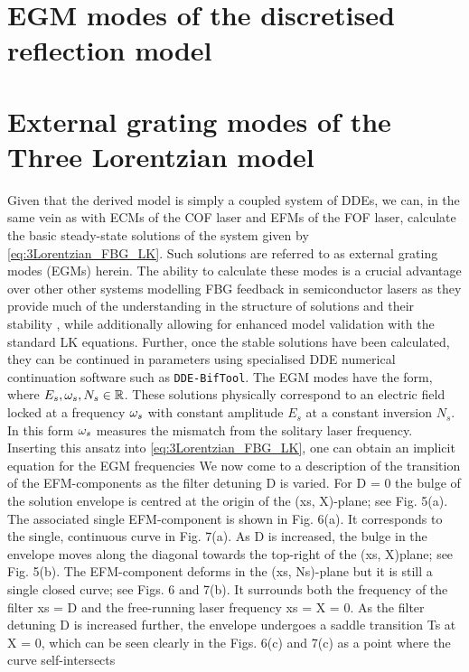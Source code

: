 \section{EGM modes of the discretised reflection model}
\label{sec:EGM_discretised}
%
\section{External grating modes of the Three Lorentzian model}
%
Given that the derived model is simply a coupled system of DDEs, we can, in the same vein as with ECMs of the COF laser and EFMs of the FOF laser, calculate the basic steady-state solutions of the system given by \eqref{eq:3Lorentzian_FBG_LK}. 
Such solutions are referred to as external grating modes (EGMs) herein. 
The ability to calculate these modes is a crucial advantage over other other systems modelling FBG feedback in semiconductor lasers as they provide much of the understanding in the structure of solutions and their stability \cite{rottschafer2007ecm}, while additionally allowing for enhanced model validation with the standard LK equations. 
Further, once the stable solutions have been calculated, they can be continued in parameters using specialised DDE numerical continuation software such as \texttt{DDE-BifTool}. 
The EGM modes have the form,
%
where $E_s, \omega_s, N_s \in \mathbb{R}$. 
These solutions physically correspond to an electric field locked at a frequency $\omega_s$ with constant amplitude $E_s$ at a constant inversion $N_s$. 
In this form $\omega_s$ measures the mismatch from the solitary laser frequency. 
Inserting this ansatz into \eqref{eq:3Lorentzian_FBG_LK}, one can obtain an implicit equation for the EGM frequencies
%
We now come to a description of the transition of the EFM-components as the filter detuning D is varied. 
For D = 0 the bulge of the solution envelope is centred at the origin of the (xs, X)-plane; see Fig. 5(a). 
The associated single EFM-component is shown in Fig. 6(a). It corresponds to the single, continuous curve in Fig. 7(a). 
As D is increased, the bulge in the envelope moves along the diagonal towards the top-right of the (xs, X)plane; see Fig. 5(b). 
The EFM-component deforms in the (xs, Ns)-plane but it is still a single closed curve; see Figs. 6 and 7(b). 
It surrounds both the frequency of the filter xs = D and the free-running laser frequency xs = X = 0. 
As the filter detuning D is increased further, the envelope undergoes a saddle transition Ts at X = 0, which can be seen clearly in the Figs. 6(c) and 7(c) as a point where the curve self-intersects
